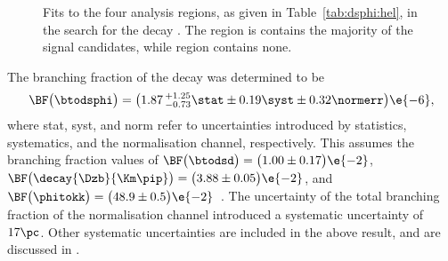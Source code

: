 \begin{figure}
  \begin{center}
    \caption[Fits to \btodsphi data]
    {
      Fits to the four analysis regions, as given in Table~\ref{tab:dsphi:hel}, in the search for
      the decay \btodsphi.
      The region \rA is contains the majority of the signal candidates, while region \rD contains
      none.
    }
    \label{fig:dsphi:fits}
  \end{center}
\end{figure}

The branching fraction of the decay \btodsphi was determined to be
\begin{equation}
  \BF\big(\btodsphi\big) =
  \big(1.87\,^{+1.25}_{-0.73}\stat\pm0.19\syst\pm0.32\normerr\big)\e{-6},
  \label{eq:dsphi:result}
\end{equation}
where stat, syst, and norm refer to uncertainties introduced by statistics, systematics, and the
normalisation channel, respectively.
This assumes the branching fraction values of
$\BF\big(\btodsd\big)=\big(1.00\pm0.17\big)\e{-2}$,
$\BF\big(\decay{\Dzb}{\Km\pip}\big)=\big(3.88\pm0.05\big)\e{-2}$, and
$\BF\big(\phitokk\big)=\big(48.9\pm0.5\big)\e{-2}$~\cite{PDG2012}.
The uncertainty of the total branching fraction of the normalisation channel introduced a systematic
uncertainty of $17\pc$.
Other systematic uncertainties are included in the above result, and are discussed in
.






